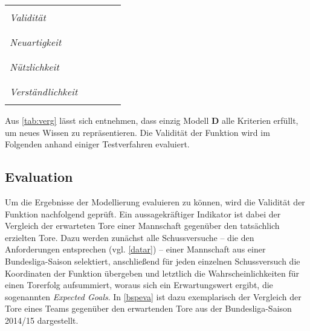\tablehead{}
\tabletail{}
\begin{center}%
\begin{supertabular}{ | P{4cm} | P{2cm}  | P{2cm} | P{2cm}  |  P{2cm}  |}
&&&&\\
\textit{Validität}	& \textcolor{red}{}	 & \textcolor{orange}{} & \textcolor{orange}{}	&\textcolor{green}{}	\\
&&&&\\
\hline
&&&&\\
\textit{Neuartigkeit}	& \textcolor{green}{}	 & \textcolor{green}{}	& \textcolor{green}{}	& \textcolor{green}{}	\\
&&&&\\
\hline
&&&&\\
\textit{Nützlichkeit}	&\textcolor{red}{}	 & \textcolor{orange}{} & \textcolor{orange}{}	& \textcolor{green}{}	\\
&&&&\\
\hline
&&&&\\
\textit{Verständlichkeit}	&\textcolor{red}{}	 & \textcolor{red}{}	& \textcolor{orange}{}	& \textcolor{green}{}	\\
&&&&\\
\hline
\end{supertabular}
\end{center}

Aus \vref{tab:verg} lässt sich entnehmen, dass einzig Modell \textbf{D} alle Kriterien erfüllt, um neues Wissen zu repräsentieren. Die Validität der Funktion wird im Folgenden anhand einiger Testverfahren evaluiert.

\subsection{Evaluation}
\label{eva}
Um die Ergebnisse der Modellierung evaluieren zu können, wird die Validität der Funktion nachfolgend geprüft. Ein aussagekräftiger Indikator ist dabei der Vergleich der erwarteten Tore einer Mannschaft gegenüber den tatsächlich erzielten Tore. Dazu werden zunächst alle Schussversuche -- die den Anforderungen entsprechen (vgl. \vref{datar}) -- einer Mannschaft aus einer Bundesliga-Saison selektiert, anschließend für jeden einzelnen Schussversuch die Koordinaten der Funktion übergeben und letztlich die Wahrscheinlichkeiten für einen Torerfolg aufsummiert, woraus sich ein Erwartungswert ergibt, die sogenannten \textit{Expected Goals}. In \vref{bspeva} ist dazu exemplarisch der Vergleich der Tore eines Teams gegenüber den erwartenden Tore aus der Bundesliga-Saison 2014/15 dargestellt.

